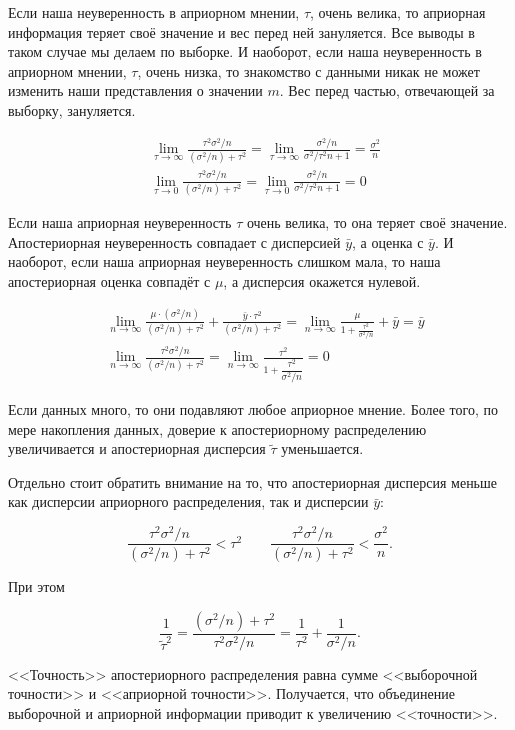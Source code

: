 \begin{problem}
\begin{sol}
Если наша неуверенность в априорном мнении, $\tau$, очень велика, то априорная информация теряет своё значение и вес перед ней зануляется. Все выводы в таком случае мы делаем по выборке. И наоборот, если наша неуверенность в априорном мнении, $
\tau$, очень низка, то знакомство с данными никак не может изменить наши представления о значении $m$. Вес перед частью, отвечающей за выборку, зануляется.

\begin{align*}
&\lim_{\tau \to \infty} \frac{\tau^2 \sigma^2/n}{(\sigma^2/n) + \tau^2} = \lim_{\tau \to \infty} \frac{\sigma^2/n}{\sigma^2/\tau^2 n + 1} = \frac{\sigma^2}{n} \\
&\lim_{\tau \to 0} \frac{\tau^2 \sigma^2/n}{(\sigma^2/n) + \tau^2} = \lim_{\tau \to 0} \frac{\sigma^2/n}{\sigma^2/\tau^2 n + 1} = 0
\end{align*}

Если наша априорная неуверенность $\tau$ очень велика, то она теряет своё значение. Апостериорная неуверенность совпадает с дисперсией $\bar y$, а оценка с $\bar y$. И наоборот, если наша априорная неуверенность слишком мала, то наша апостериорная оценка совпадёт с $\mu$, а дисперсия окажется нулевой.

\begin{align*}
&\lim_{n \to \infty} \frac{\mu \cdot (\sigma^2/n)}{(\sigma^2/n) + \tau^2} + \frac{\bar y \cdot \tau^2}{(\sigma^2/n) + \tau^2} = \lim_{n \to \infty} \frac{\mu}{1 + \frac{\tau^2}{\sigma^2/n}} + \bar y = \bar y \\
&\lim_{n \to \infty} \frac{\tau^2 \sigma^2/n}{(\sigma^2/n) + \tau^2} = \lim_{n \to \infty} \frac{\tau^2}{1 + \dfrac{\tau^2}{\sigma^2/n}} = 0
\end{align*}

Если данных много, то они подавляют любое априорное мнение. Более того, по мере накопления данных, доверие к апостериорному распределению увеличивается и апостериорная дисперсия $\tilde \tau$  уменьшается. 

Отдельно стоит обратить внимание на то, что апостериорная дисперсия меньше как дисперсии априорного распределения, так и дисперсии $\bar y$: 

\[  \frac{\tau^2 \sigma^2/n}{(\sigma^2/n) + \tau^2} < \tau^2 \qquad \frac{\tau^2 \sigma^2/n}{(\sigma^2/n) + \tau^2} < \frac{\sigma^2}{n}. \] 

При этом 

\[ \frac{1}{\tilde{\tau}^2} = \frac{(\sigma^2/n) + \tau^2}{\tau^2 \sigma^2/n} = \frac{1}{\tau^2} + \frac{1}{\sigma^2/n}.\]

<<Точность>> апостериорного распределения равна сумме <<выборочной точности>> и <<априорной точности>>. Получается, что объединение выборочной и априорной информации приводит к увеличению <<точности>>. 
\end{sol}
\end{problem}

